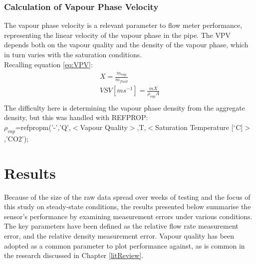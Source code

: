 \documentclass{report}
\begin{document}
\subsection{Calculation of Vapour Phase Velocity}
The vapour phase velocity is a relevant parameter to flow meter performance, representing the linear velocity of the vapour phase in the pipe. The VPV depends both on the vapour quality  and the density of the vapour phase, which in turn varies with the saturation conditions.\\
Recalling equation \ref{eq:VPV}:
\begin{eqnarray}
X=\frac{\dot{m}_{vap}}{\dot{m}_{fluid}}\\
VSV[ms^{-1}]=\frac{\dot{m}X}{\rho_{vap}A} \\
\end{eqnarray}
The difficulty here is determining the vapour phase density from the aggregate density, but this was handled with REFPROP:\\
$\rho_{vap}$=refpropm('-','Q',$<$Vapour Quality$>$,T,$<$Saturation Temperature [$^\circ$C]$>$,'CO2');

\chapter{Results} \label{results}
Because of the size of the raw data spread over weeks of testing and the focus of this study on steady-state conditions, the results presented below summarise the sensor's performance by examining measurement errors under various conditions. The key parameters have been defined as the relative flow rate measurement error, and the relative density measurement error. Vapour quality has been adopted as a common parameter to plot performance against, as is common in the research discussed in Chapter \ref{litReview}.
\end{document}

